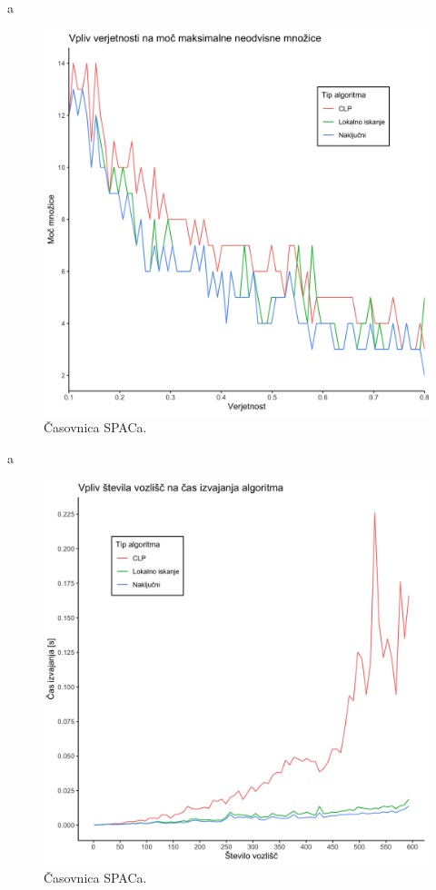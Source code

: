 \documentclass[a4paper, 12pt]{article}
\begin{document}
a
\begin{figure}[h!]
	\begin{center}
		\includegraphics[width=\textwidth]{R_koda/ver-moc.png}
		\caption{Časovnica SPACa.}
	\end{center}
\end{figure}
a
\begin{figure}[h!]
	\begin{center}
		\includegraphics[width=\textwidth]{R_koda/voz-cas.png}
		\caption{Časovnica SPACa.}
	\end{center}
\end{figure}
\end{document}
